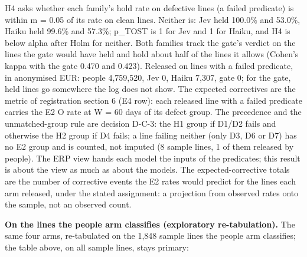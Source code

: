 \documentclass[
  10pt,
]{article}
\begin{document}
H4 asks whether each family's hold rate on defective lines (a failed
predicate) is within m = 0.05 of its rate on clean lines. Neither is:
Jev held 100.0\% and 53.0\%, Haiku held 99.6\% and 57.3\%; p\_TOST is 1
for Jev and 1 for Haiku, and H4 is below alpha after Holm for neither.
Both families track the gate's verdict on the lines the gate would have
held and hold about half of the lines it allows (Cohen's kappa with the
gate 0.470 and 0.423). Released on lines with a failed predicate, in
anonymised EUR: people 4,759,520, Jev 0, Haiku 7,307, gate 0; for the
gate, held lines go somewhere the log does not show. The expected
correctives are the metric of registration section 6 (E4 row): each
released line with a failed predicate carries the E2 O rate at W = 60
days of its defect group. The precedence and the unmatched-group rule
are decision D-C-3: the H1 group if D1/D2 fails and otherwise the H2
group if D4 fails; a line failing neither (only D3, D6 or D7) has no E2
group and is counted, not imputed (8 sample lines, 1 of them released by
people). The ERP view hands each model the inputs of the predicates;
this result is about the view as much as about the models. The
expected-corrective totals are the number of corrective events the E2
rates would predict for the lines each arm released, under the stated
assignment: a projection from observed rates onto the sample, not an
observed count.

\textbf{On the lines the people arm classifies (exploratory
re-tabulation).} The same four arms, re-tabulated on the 1,848 sample
lines the people arm classifies; the table above, on all sample lines,
stays primary:
\end{document}
